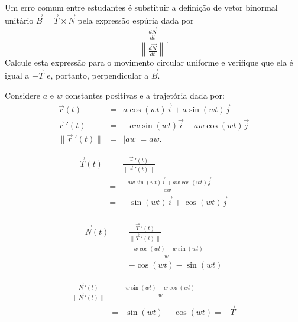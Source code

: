 \begin{exeresol}
Um erro comum entre estudantes é substituir a definição de vetor binormal unitário $\vec{B}=\vec{T}\times\vec{N}$ pela expressão espúria dada por $$\frac{\frac{d\vec{N}}{dt}}{\left\|\frac{d\vec{N}}{dt}\right\|}.$$ Calcule esta expressão para o movimento circular uniforme e verifique que ela é igual a $-\vec{T}$ e, portanto, perpendicular a $\vec{B}$.
\end{exeresol}
\begin{resol}
 Considere $a$ e $w$ constantes positivas e a trajetória dada por:
 \begin{eqnarray*}
\vec{r}(t)&=&a\cos(wt)\vec{i}+a\sin(wt)\vec{j}\\
\vec{r}~\!'(t)&=&-aw\sin(wt)\vec{i}+aw\cos(wt)\vec{j}\\
\|\vec{r}~\!'(t)\|&=&|aw|=aw.
 \end{eqnarray*}

 \begin{eqnarray*}
\vec{T}(t)&=&\frac{\vec{r}~\!'(t)}{\|\vec{r}~\!'(t)\|}\\
 &=&\frac{-aw\sin(wt)\vec{i}+aw\cos(wt)\vec{j}}{aw}\\
 &=&{-\sin(wt)\vec{i}+\cos(wt)\vec{j}}\\
 \end{eqnarray*}

 \begin{eqnarray*}
\vec{N}(t)&=&\frac{\vec{T}~\!'(t)}{\|\vec{T}~\!'(t)\|}\\
  &=&\frac{-w\cos(wt)-w\sin(wt)}{w}\\
  &=&{-\cos(wt)-\sin(wt)}
 \end{eqnarray*}

 \begin{eqnarray*}
\frac{\vec{N}~\!'(t)}{\|\vec{N}~\!'(t)\|}
  &=&\frac{w\sin(wt)-w\cos(wt)}{w}\\
  &=&{\sin(wt)-\cos(wt)}=-\vec{T}
 \end{eqnarray*}
\end{resol}

